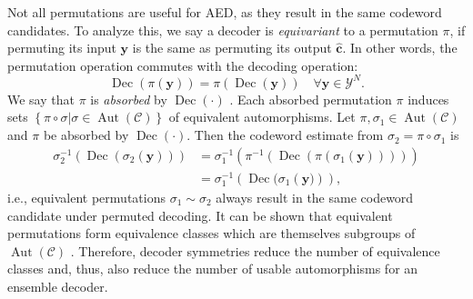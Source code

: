 \documentclass[conference]{IEEEtran}
\begin{document}
\begin{NoHyper}
Not all permutations are useful for \ac{AED}, as they result in the same codeword candidates. To analyze this, we say a decoder is \textit{equivariant} to a permutation $\pi$, if permuting its input $\mathbf{y}$ is the same as permuting its output $\hat{\mathbf{c}}$. In other words, the permutation operation commutes with the decoding operation:
\begin{equation}
    \operatorname{Dec}\left(\pi(\mathbf{y})\right) = \pi\left(\operatorname{Dec}(\mathbf{y})\right) \quad \forall \mathbf{y}\in\mathcal{Y}^N.
\end{equation}
We say that $\pi$ is \textit{absorbed} by $\operatorname{Dec}(\cdot)$ \cite{rm_automorphism_ensemble_decoding}. Each absorbed permutation $\pi$ induces sets $\left\{\pi\circ\sigma|\sigma\in\operatorname{Aut}(\mathcal{C})\right\}$ of equivalent automorphisms. Let $\pi,\sigma_1 \in \operatorname{Aut}(\mathcal{C})$ and $\pi$ be absorbed by $\operatorname{Dec}(\cdot)$. Then the codeword estimate from $\sigma_2=\pi\circ\sigma_1$ is 
\begin{align}
\sigma_2^{-1}\left(\operatorname{Dec}\left(\sigma_2(\mathbf{y})\right)\right) &=
\sigma_1^{-1}\left(\pi^{-1}\left(\operatorname{Dec}\left(\pi\left(\sigma_1(\mathbf{y})\right)\right)\right)\right)\nonumber\\
&= \sigma_1^{-1}\left(\operatorname{Dec}(\sigma_1\left(\mathbf{y})\right)\right),
\end{align}
i.e., equivalent permutations $\sigma_1 \sim \sigma_2$ always result in the same codeword candidate under permuted decoding. It can be shown that equivalent permutations form equivalence classes which are themselves subgroups of $\operatorname{Aut}(\mathcal{C})$ \cite{pillet2021automorphismclassification}.  Therefore, decoder symmetries reduce the number of equivalence classes and, thus, also reduce the number of usable automorphisms for an ensemble decoder.


\end{NoHyper}
\end{document}
